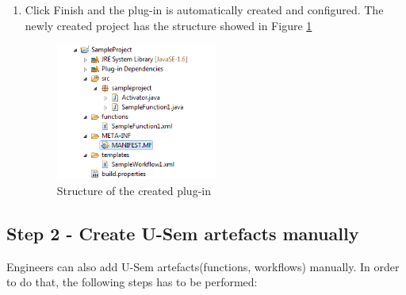\begin{enumerate}
		\item Click Finish and the plug-in is automatically created and configured. The newly created project has the structure showed in Figure \ref{struct}
		
\begin{figure}
  \centering
    \includegraphics[width=0.5\textwidth]{apendix/PluginTutorial/fileStruct.png}
    \caption{Structure of the created plug-in}
    \label{struct}
\end{figure}

	\end{enumerate}

\subsection{Step 2 - Create U-Sem artefacts manually}
Engineers can also add U-Sem artefacts(functions, workflows) manually. In order to do that, the following steps has to be performed:

